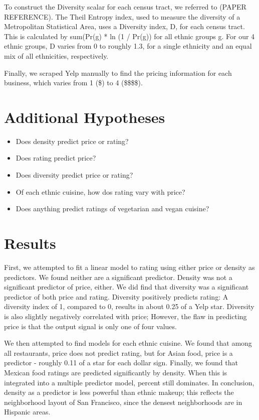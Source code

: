 \documentclass[11pt,twocolumn]{article}
\begin{document}
To construct the Diversity scalar for each census tract, we referred to (PAPER REFERENCE). The Theil Entropy index, used to measure the diversity of a Metropolitan Statistical Area, uses a Diversity index, D, for each census tract. This is calculated by sum(Pr(g) * ln (1 / Pr(g)) for all ethnic groups g. For our 4 ethnic groups, D varies from 0 to roughly 1.3, for a single ethnicity and an equal mix of all ethnicities, respectively. 

Finally, we scraped Yelp manually to find the pricing information for each business, which varies from 1 (\$) to 4 (\$\$\$\$).

\section{Additional Hypotheses}
\begin{itemize}
\item Does density predict price or rating?
\item Does rating predict price?
\item Does diversity predict price or rating?
\item Of each ethnic cuisine, how dos rating vary with price?
\item Does anything predict ratings of vegetarian and vegan cuisine?
\end{itemize}
\section{Results}

First, we attempted to fit a linear model to rating using either price or density as predictors. We found neither are a significant predictor. Density was not a significant predictor of price, either. We did find that diversity was a significant predictor of both price and rating. Diversity positively predicts rating: A diversity index of 1, compared to 0, results in about 0.25 of a Yelp star. Diversity is also slightly negatively correlated with price; However, the flaw in predicting price is that the output signal is only one of four values. 

We then attempted to find models for each ethnic cuisine. We found that among all restaurants, price does not predict rating, but for Asian food, price is a predictor - roughly 0.11 of a star for each dollar sign. Finally, we found that Mexican food ratings are predicted significantly by density. When this is integrated into a multiple predictor model, percent still dominates. In conclusion, density as a predictor is less powerful than ethnic makeup; this reflects the neighborhood layout of San Francisco, since the densest neighborhoods are in Hispanic areas.
\end{document}
